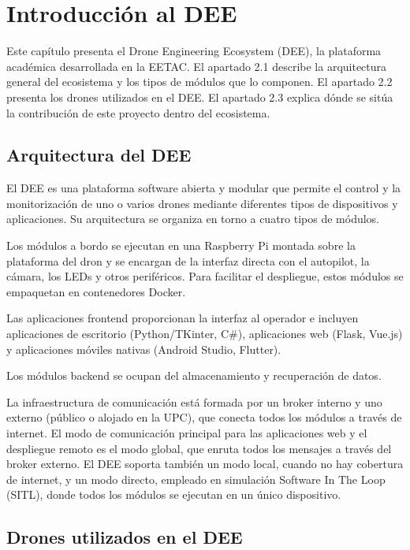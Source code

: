 \chapter{Introducción al DEE}   %
Este capítulo presenta el Drone Engineering Ecosystem (DEE), la plataforma académica desarrollada en la EETAC. El apartado 2.1 describe la arquitectura general del ecosistema y los tipos de módulos que lo componen. El apartado 2.2 presenta los drones utilizados en el DEE. El apartado 2.3 explica dónde se sitúa la contribución de este proyecto dentro del ecosistema.

\section{Arquitectura del DEE}

El DEE es una plataforma software abierta y modular que permite el control y la monitorización de uno o varios drones mediante diferentes tipos de dispositivos y aplicaciones. Su arquitectura se organiza en torno a cuatro tipos de módulos.

Los módulos a bordo se ejecutan en una Raspberry Pi montada sobre la plataforma del dron y se encargan de la interfaz directa con el autopilot, la cámara, los LEDs y otros periféricos. Para facilitar el despliegue, estos módulos se empaquetan en contenedores Docker.

Las aplicaciones frontend proporcionan la interfaz al operador e incluyen aplicaciones de escritorio (Python/TKinter, C\#), aplicaciones web (Flask, Vue.js) y aplicaciones móviles nativas (Android Studio, Flutter).

Los módulos backend se ocupan del almacenamiento y recuperación de datos.

La infraestructura de comunicación está formada por un broker interno y uno externo (público o alojado en la UPC), que conecta todos los módulos a través de internet. El modo de comunicación principal para las aplicaciones web y el despliegue remoto es el modo global, que enruta todos los mensajes a través del broker externo. El DEE soporta también un modo local, cuando no hay cobertura de internet, y un modo directo, empleado en simulación Software In The Loop (SITL), donde todos los módulos se ejecutan en un único dispositivo.


\section{Drones utilizados en el DEE}

